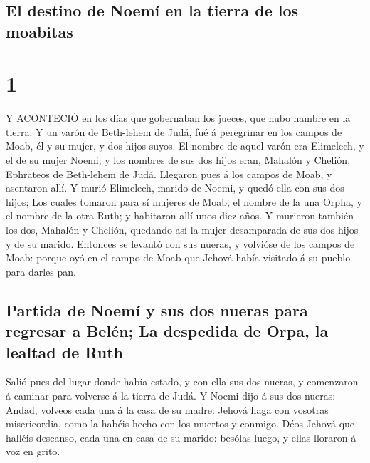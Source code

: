 \hypertarget{el-destino-de-noemuxed-en-la-tierra-de-los-moabitas}{%
\subsection{El destino de Noemí en la tierra de los
moabitas}\label{el-destino-de-noemuxed-en-la-tierra-de-los-moabitas}}

\hypertarget{section}{%
\section{1}\label{section}}

 Y ACONTECIÓ en los días que gobernaban los jueces, que hubo
hambre en la tierra. Y un varón de Beth-lehem de Judá, fué á peregrinar
en los campos de Moab, él y su mujer, y dos hijos suyos.  El
nombre de aquel varón era Elimelech, y el de su mujer Noemi; y los
nombres de sus dos hijos eran, Mahalón y Chelión, Ephrateos de
Beth-lehem de Judá. Llegaron pues á los campos de Moab, y asentaron
allí.  Y murió Elimelech, marido de Noemi, y quedó ella con
sus dos hijos;  Los cuales tomaron para sí mujeres de Moab,
el nombre de la una Orpha, y el nombre de la otra Ruth; y habitaron allí
unos diez años.  Y murieron también los dos, Mahalón y
Chelión, quedando así la mujer desamparada de sus dos hijos y de su
marido.  Entonces se levantó con sus nueras, y volvióse de
los campos de Moab: porque oyó en el campo de Moab que Jehová había
visitado á su pueblo para darles pan.

\hypertarget{partida-de-noemuxed-y-sus-dos-nueras-para-regresar-a-beluxe9n-la-despedida-de-orpa-la-lealtad-de-ruth}{%
\subsection{Partida de Noemí y sus dos nueras para regresar a Belén; La
despedida de Orpa, la lealtad de
Ruth}\label{partida-de-noemuxed-y-sus-dos-nueras-para-regresar-a-beluxe9n-la-despedida-de-orpa-la-lealtad-de-ruth}}

 Salió pues del lugar donde había estado, y con ella sus dos
nueras, y comenzaron á caminar para volverse á la tierra de Judá.
 Y Noemi dijo á sus dos nueras: Andad, volveos cada una á la
casa de su madre: Jehová haga con vosotras misericordia, como la habéis
hecho con los muertos y conmigo.  Déos Jehová que halléis
descanso, cada una en casa de su marido: besólas luego, y ellas lloraron
á voz en grito.

